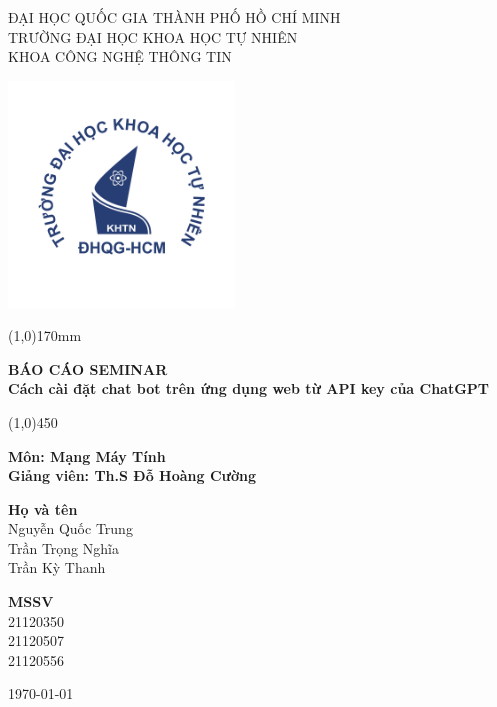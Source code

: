 \documentclass[a4paper, 12pt]{article}
\begin{document}
	\begin{titlepage}
		\centering
		
		\textsc{\Large ĐẠI HỌC QUỐC GIA THÀNH PHỐ HỒ CHÍ MINH}\\
		\vspace{0,2cm}
		\textsc{\Large TRƯỜNG  ĐẠI HỌC KHOA HỌC TỰ NHIÊN}\\
		\vspace{0,2cm}
		\textsc{\large KHOA CÔNG NGHỆ THÔNG TIN}
			
		\begin{centering}
			{\includegraphics[width=6cm]{logo.png}}
		\end{centering}
		
		\begin{center}
			\line(1,0){170mm}
		\end{center}
		\Huge \textbf{BÁO CÁO SEMINAR}\\ 
		\vspace{0.1cm}
		\vspace{0.1cm}
		\Huge \textbf{Cách cài đặt chat bot trên ứng dụng web từ API key của ChatGPT} \\
		\begin{center}
			\line(1,0){450}
		\end{center}
		
		\vspace{0,2cm}
		\huge \textbf{Môn: Mạng Máy Tính}\\
		\Large{\textbf{Giảng viên: Th.S Đỗ Hoàng Cường}}
		\Large
		\vspace{1cm}
		\begin{multicols}{2}
			\begin{flushright}
			\textbf{Họ và tên}\\
			Nguyễn Quốc Trung\\
			Trần Trọng Nghĩa\\
			Trần Kỳ Thanh\\
			\end{flushright}
			\columnbreak
			\begin{flushleft}
			\textbf{MSSV}\\
			21120350\\
			21120507\\
			21120556\\
			\end{flushleft}
		\end{multicols}

		
		\vspace{1cm}
		{\scshape \today}
	\end{titlepage}
\end{document}
